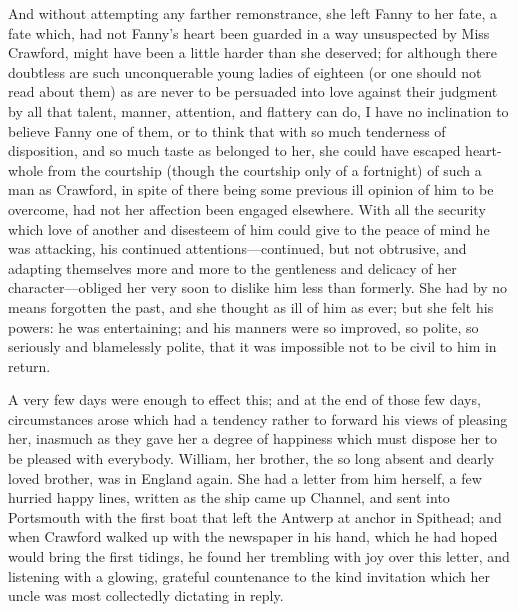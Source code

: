 \documentclass{article}
\begin{document}
And without attempting any farther remonstrance, she left
Fanny to her fate, a fate which, had not Fanny's heart
been guarded in a way unsuspected by Miss Crawford,
might have been a little harder than she deserved;
for although there doubtless are such unconquerable young
ladies of eighteen (or one should not read about them)
as are never to be persuaded into love against their judgment
by all that talent, manner, attention, and flattery can do,
I have no inclination to believe Fanny one of them,
or to think that with so much tenderness of disposition,
and so much taste as belonged to her, she could have
escaped heart-whole from the courtship (though the
courtship only of a fortnight) of such a man as Crawford,
in spite of there being some previous ill opinion of him
to be overcome, had not her affection been engaged elsewhere.
With all the security which love of another and disesteem
of him could give to the peace of mind he was attacking,
his continued attentions---continued, but not obtrusive,
and adapting themselves more and more to the gentleness
and delicacy of her character---obliged her very soon
to dislike him less than formerly.  She had by no means
forgotten the past, and she thought as ill of him as ever;
but she felt his powers:  he was entertaining; and his
manners were so improved, so polite, so seriously and
blamelessly polite, that it was impossible not to be civil
to him in return.

A very few days were enough to effect this; and at the end
of those few days, circumstances arose which had a tendency
rather to forward his views of pleasing her, inasmuch as
they gave her a degree of happiness which must dispose
her to be pleased with everybody.  William, her brother,
the so long absent and dearly loved brother, was in
England again.  She had a letter from him herself, a few
hurried happy lines, written as the ship came up Channel,
and sent into Portsmouth with the first boat that left
the Antwerp at anchor in Spithead; and when Crawford walked
up with the newspaper in his hand, which he had hoped
would bring the first tidings, he found her trembling
with joy over this letter, and listening with a glowing,
grateful countenance to the kind invitation which her
uncle was most collectedly dictating in reply.
\end{document}
